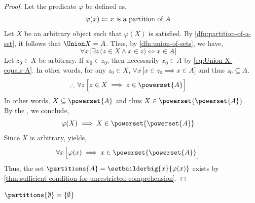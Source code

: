 \begin{proof}
    Let the predicate \( \varphi \) be defined as,
    \begin{equation*}
        \varphi(x) \coloneq \text{\( x \) is a partition of \( A \)}
    \end{equation*}
    Let \( X \) be an arbitrary object such that \( \varphi(X) \) is satisfied.
    By \cref{dfn:partition-of-a-set}, it follows that \( \Union X = A \). Thus,
    by \cref{dfn:union-of-sets}, we have,
    \begin{equation}
        \label{eq:Union-X-equals-A}
        \forall x \, \Big[ \exists z \, \big( z \in X \land x \in z \big) \iff x \in A  \Big]
    \end{equation}
    Let \( z_{0} \in X \) be arbitrary. If \( x_{0} \in z_{0} \), then necessarily \( x_{0} \in A \)
    by \eqref{eq:Union-X-equals-A}. In other words, for any \( z_{0} \in X \),
    \( \forall x \, \big[ x \in z_{0} \implies x \in A \big] \) and thus \( z_{0} \subseteq A\).
    \begin{equation*}
        \therefore \, \forall z \, \Big[ z \in X \implies z \in \powerset{A} \Big]
    \end{equation*}
    In other words, \( X \subseteq \powerset{A} \) and thus \( X \in \powerset{\powerset{A}} \).
    By the , we conclude,
    \begin{equation*}
        \varphi(X) \implies X \in \powerset{\powerset{A}}
    \end{equation*}
    Since \( X \) is arbitrary,  yields,
    \begin{equation*}
        \forall x \, \Big[ \varphi(x) \implies x \in \powerset{\powerset{A}} \Big]
    \end{equation*}
    Thus, the set \( \partitions{A} = \setbuilderbig{x}{\varphi(x)} \) exists
    by \cref{thm:sufficient-condition-for-unrestricted-comprehension}.
\end{proof}

\begin{thm}
    \label{thm:the-only-partition-for-the-empty-set-is-the-empty-set}
    \( \partitions{\emptyset} = \mleft\{ \emptyset \mright\} \)
\end{thm}

